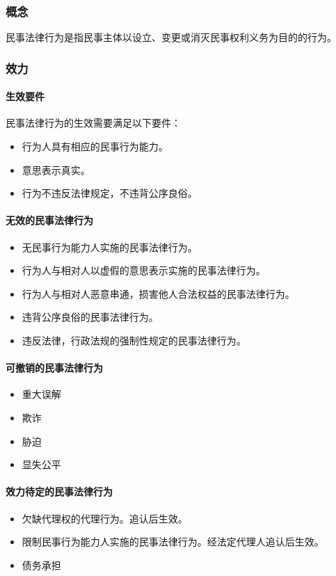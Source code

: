 
\subsubsection{概念}

民事法律行为是指民事主体以设立、变更或消灭民事权利义务为目的的行为。

\subsubsection{效力}

\paragraph{生效要件}

民事法律行为的生效需要满足以下要件：

\begin{itemize}
	\item 行为人具有相应的民事行为能力。
	\item 意思表示真实。
	\item 行为不违反法律规定，不违背公序良俗。
\end{itemize}

\paragraph{无效的民事法律行为}

\begin{itemize}
	\item 无民事行为能力人实施的民事法律行为。
	\item 行为人与相对人以虚假的意思表示实施的民事法律行为。
	\item 行为人与相对人恶意串通，损害他人合法权益的民事法律行为。
	\item 违背公序良俗的民事法律行为。
	\item 违反法律，行政法规的强制性规定的民事法律行为。
\end{itemize}

\paragraph{可撤销的民事法律行为}

\begin{itemize}
	\item 重大误解
	\item 欺诈
	\item 胁迫
	\item 显失公平
\end{itemize}

\paragraph{效力待定的民事法律行为}

\begin{itemize}
	\item 欠缺代理权的代理行为。追认后生效。
	\item 限制民事行为能力人实施的民事法律行为。经法定代理人追认后生效。
	\item 债务承担
\end{itemize}
